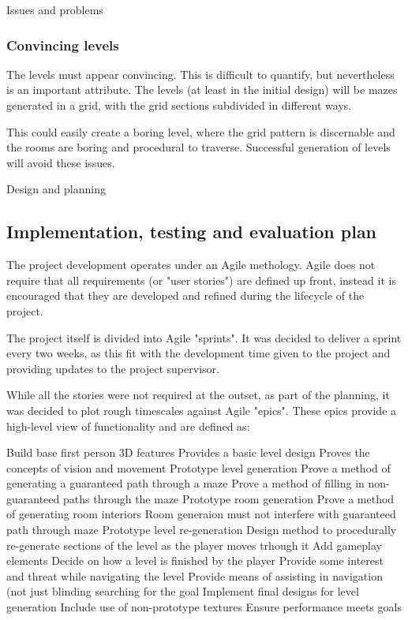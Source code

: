 \documentclass[progress]{cmpreport}
\begin{document}
\begin{section}{Issues and problems}
\subsubsection{Convincing levels}
The levels must appear convincing. This is difficult to quantify, but nevertheless is an important attribute. The levels (at least in the initial design) will be mazes generated in a grid, with the grid sections subdivided in different ways.

This could easily create a boring level, where the grid pattern is discernable and the rooms are boring and procedural to traverse. Successful generation of levels will avoid these issues.

\end{section}

\begin{section}{Design and planning}

\subsection{Implementation, testing and evaluation plan}
The project development operates under an Agile methology. Agile does not require that all requirements (or "user stories") are defined up front, instead it is encouraged that they are developed and refined during the lifecycle of the project.

The project itself is divided into Agile "sprints". It was decided to deliver a sprint every two weeks, as this fit with the development time given to the project and providing updates to the project supervisor.

While all the stories were not required at the outset, as part of the planning, it was decided to plot rough timescales against Agile "epics". These epics provide a high-level view of functionality and are defined as:

\begin{outline}
    \1 Build base first person 3D features
        \2 Provides a basic level design
        \2 Proves the concepts of vision and movement
    \1 Prototype level generation
        \2 Prove a method of generating a guaranteed path through a maze
        \2 Prove a method of filling in non-guaranteed paths through the maze
    \1 Prototype room generation
        \2 Prove a method of generating room interiors
        \2 Room generaion must not interfere with guaranteed path through maze
    \1 Prototype level re-generation
        \2 Design method to procedurally re-generate sections of the level as the player moves trhough it
    \1 Add gameplay elements
        \2 Decide on how a level is finished by the player
        \2 Provide some interest and threat while navigating the level
        \2 Provide means of assisting in navigation (not just blinding searching for the goal
    \1 Implement final designs for level generation
        \2 Include use of non-prototype textures
        \2 Ensure performance meets goals 
\end{outline}


\end{section}
\end{document}
